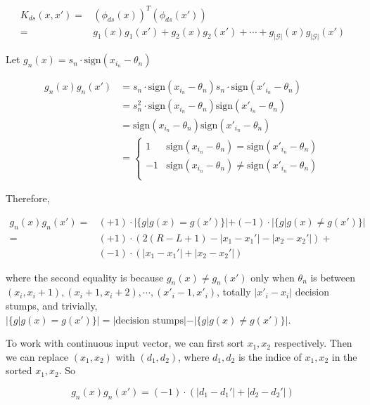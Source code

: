 \documentclass[fleqn,a4paper,12pt]{article}
\begin{document}
\begin{align*}
  K_{ds}(x, x')
  =& (\phi_{ds}(x))^T(\phi_{ds}(x')) \\
  =& g_1(x)g_1(x') + g_2(x)g_2(x') + \cdots + g_{|\mathcal{G}|}(x)g_{|\mathcal{G}|}(x')
\end{align*}

Let $g_n(x) = s_n \cdot \mathrm{sign}(x_{i_n} - \theta_n)$

\begin{align*}
  g_n(x)g_n(x')
  &= s_n \cdot \mathrm{sign}(x_{i_n} - \theta_n) s_n \cdot \mathrm{sign}(x'_{i_n} - \theta_n) \\
  &= s_n^2 \cdot \mathrm{sign}(x_{i_n} - \theta_n) \mathrm{sign}(x'_{i_n} - \theta_n) \\  
  &= \mathrm{sign}(x_{i_n} - \theta_n) \mathrm{sign}(x'_{i_n} - \theta_n) \\
  &=\begin{cases}
    1 & \mathrm{sign}(x_{i_n} - \theta_n) = \mathrm{sign}(x'_{i_n} - \theta_n) \\
    -1 & \mathrm{sign}(x_{i_n} - \theta_n) \ne \mathrm{sign}(x'_{i_n} - \theta_n) \\
  \end{cases}
\end{align*}

Therefore, 

\begin{align*}
  g_n(x)g_n(x')
  =& (+1) \cdot |\{g | g(x) = g(x')\}| + (-1) \cdot |\{g | g(x) \ne g(x')\}| \\
  =& (+1) \cdot (2(R - L + 1) - |x_1 - x_1'| - |x_2 - x_2'|) + \\
    & (-1) \cdot (|x_1 - x_1'| + |x_2 - x_2'|)
\end{align*}

where the second equality is because $g_n(x) \ne g_n(x')$ only when $\theta_n$ is between $(x_i, x_i + 1), (x_i + 1, x_i + 2), \cdots, (x'_i - 1, x'_i)$, totally $|x'_i - x_i|$ decision stumps, and trivially, $|\{g | g(x) = g(x')\}| = |\text{decision stumps}| - |\{g | g(x) \ne g(x')\}|$.

To work with continuous input vector, we can first sort $x_1, x_2$ respectively. Then we can replace $(x_1, x_2)$ with $(d_1, d_2)$, where $d_1, d_2$ is the indice of $x_1, x_2$ in the sorted $x_1, x_2$. So 

\begin{equation*}
  g_n(x)g_n(x') = (-1) \cdot (|d_1 - d_1'| + |d_2 - d_2'|)
\end{equation*}
\end{document}
